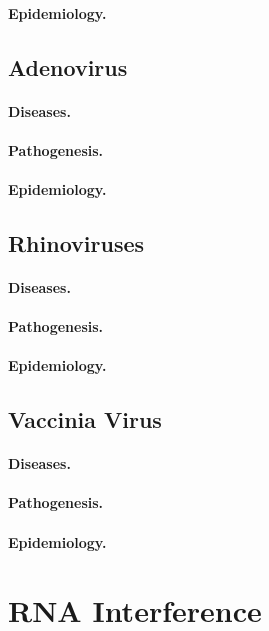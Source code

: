 \paragraph{Epidemiology.}

\subsection{Adenovirus}
\paragraph{Diseases.}
\paragraph{Pathogenesis.}
\paragraph{Epidemiology.}

\subsection{Rhinoviruses}
\paragraph{Diseases.}
\paragraph{Pathogenesis.}
\paragraph{Epidemiology.}

\subsection{Vaccinia Virus}
\paragraph{Diseases.}
\paragraph{Pathogenesis.}
\paragraph{Epidemiology.}

\section{RNA Interference}
